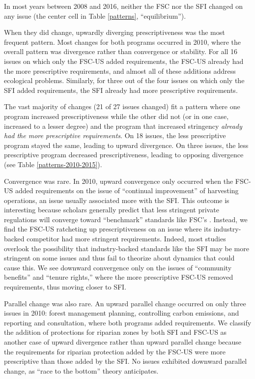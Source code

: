 \documentclass[
      12pt,
            Review ]{article}
\begin{document}
In most years between 2008 and 2016, neither the FSC nor the SFI changed on any issue (the center cell in Table \ref{patterns}, ``equilibrium'').

When they did change, upwardly diverging prescriptiveness was the most frequent pattern. Most changes for both programs occurred in 2010, where the overall pattern was divergence rather than convergence or stability. For all 16 issues on which only the FSC-US added requirements, the FSC-US already had the more prescriptive requirements, and almost all of these additions address ecological problems. Similarly, for three out of the four issues on which only the SFI added requirements, the SFI already had more prescriptive requirements.

The vast majority of changes (21 of 27 issues changed) fit a pattern where one program increased prescriptiveness while the other did not (or in one case, increased to a lesser degree) and the program that increased stringency \emph{already had the more prescriptive requirements}. On 18 issues, the less prescriptive program stayed the same, leading to upward divergence. On three issues, the less prescriptive program decreased prescriptiveness, leading to opposing divergence (see Table \ref{patterns-2010-2015}).



Convergence was rare. In 2010, upward convergence only occurred when the FSC-US added requirements on the issue of ``continual improvement'' of harvesting operations, an issue usually associated more with the SFI. This outcome is interesting because scholars generally predict that less stringent private regulations will converge toward ``benchmark'' standards like FSC's \citep{Overdevest2005, Overdevest2010}. Instead, we find the FSC-US ratcheting up prescriptiveness on an issue where its industry-backed competitor had more stringent requirements. Indeed, most studies overlook the possibility that industry-backed standards like the SFI may be more stringent on some issues and thus fail to theorize about dynamics that could cause this. We see downward convergence only on the issues of ``community benefits'' and ``tenure rights,'' where the more prescriptive FSC-US removed requirements, thus moving closer to SFI.

Parallel change was also rare. An upward parallel change occurred on only three issues in 2010: forest management planning, controlling carbon emissions, and reporting and consultation, where both programs added requirements. We classify the addition of protections for riparian zones by both SFI and FSC-US as another case of upward divergence rather than upward parallel change because the requirements for riparian protection added by the FSC-US were more prescriptive than those added by the SFI. No issues exhibited downward parallel change, as ``race to the bottom'' theory anticipates.
\end{document}
